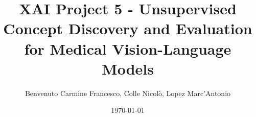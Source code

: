 \documentclass[a4paper,12pt]{report}
\title{XAI Project 5 - Unsupervised Concept Discovery and Evaluation for Medical Vision-Language Models}
\author{Benvenuto Carmine Francesco, Colle Nicolò, Lopez Marc'Antonio}
\date{\today}
\begin{document}
\maketitle
\tableofcontents
\clearpage

\nocite{*}











\printbibliography
\end{document}
